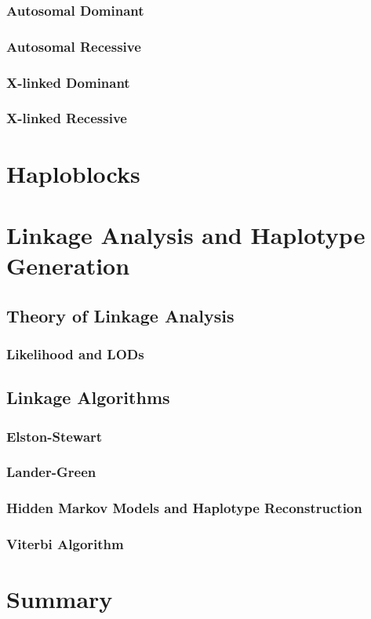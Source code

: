 \subsubsection{Autosomal Dominant}
\subsubsection{Autosomal Recessive}
\subsubsection{X-linked Dominant}
\subsubsection{X-linked Recessive}

\section{Haploblocks}

\section{Linkage Analysis and Haplotype Generation}

\subsection{Theory of Linkage Analysis}

\subsubsection{Likelihood and LODs}

\subsection{Linkage Algorithms}
\subsubsection{Elston-Stewart}
\subsubsection{Lander-Green}
\subsubsection{Hidden Markov Models and Haplotype Reconstruction}
\subsubsection{Viterbi Algorithm}

\section{Summary}